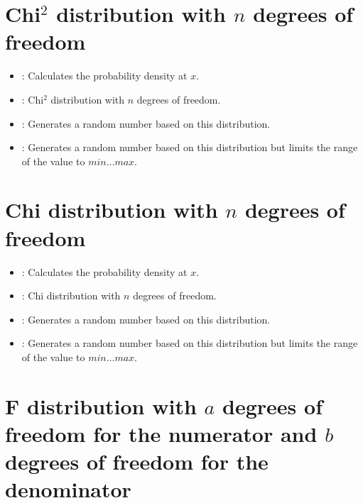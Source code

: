 \section{\texorpdfstring{Chi$^2$}{Chi2} distribution with \texorpdfstring{$n$}{n} degrees of freedom}

\begin{itemize}

\item
{}:
Calculates the probability density at $x$.

\item
{}:
Chi$^2$ distribution with $n$ degrees of freedom.

\item
{}:
Generates a random number based on this distribution.

\item
{}:
Generates a random number based on this distribution but limits the range of the value to $min\ldots max$.

\end{itemize}



\section{Chi distribution with \texorpdfstring{$n$}{n} degrees of freedom}

\begin{itemize}

\item
{}:
Calculates the probability density at $x$.

\item
{}:
Chi distribution with $n$ degrees of freedom.

\item
{}:
Generates a random number based on this distribution.

\item
{}:
Generates a random number based on this distribution but limits the range of the value to $min\ldots max$.

\end{itemize}



\section{F distribution with \texorpdfstring{$a$}{a} degrees of freedom for the numerator and \texorpdfstring{$b$}{b} degrees of freedom for the denominator}

